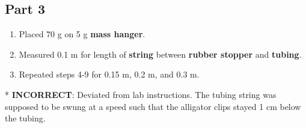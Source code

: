 	\subsection{Part 3}
	\begin{enumerate}[resume]
		\item Placed 70 g on 5 g \textbf{mass hanger}.
		\item Measured 0.1 m for length of \textbf{string} between \textbf{rubber stopper} and \textbf{tubing}.
		\item Repeated steps 4-9 for 0.15 m, 0.2 m, and 0.3 m. \\
	\end{enumerate}


	\noindent ** \textbf{INCORRECT}: Deviated from lab instructions. The tubing string was supposed to be swung at a speed such that the alligator clips stayed 1 cm below the tubing.

\newpage





